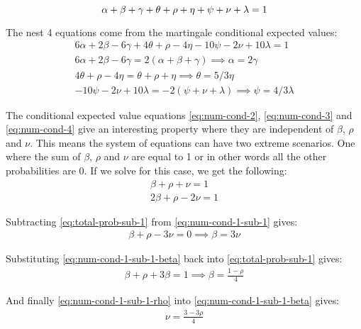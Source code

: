 \documentclass{article}
\begin{document}
\begin{equation}
    \alpha + \beta + \gamma + \theta + \rho + \eta + \psi + \nu + \lambda = 1 \label{eq:total-prob} \\
\end{equation}

The nest 4 equations come from the martingale conditional expected values:
\begin{align}
    6\alpha + 2\beta - 6\gamma + 4\theta + \rho - 4\eta - 10\psi - 2\nu + 10\lambda = 1 \label{eq:num-cond-1} \\
    6\alpha + 2\beta - 6\gamma = 2(\alpha + \beta + \gamma) \implies \alpha = 2\gamma \label{eq:num-cond-2} \\
    4\theta + \rho - 4\eta = \theta + \rho + \eta \implies \theta = 5/3\eta \label{eq:num-cond-3} \\
    - 10\psi - 2\nu + 10\lambda = - 2(\psi + \nu + \lambda) \implies \psi = 4/3 \lambda \label{eq:num-cond-4}
\end{align}

The conditional expected value equations \ref{eq:num-cond-2}, \ref{eq:num-cond-3} and \ref{eq:num-cond-4} give an interesting property where they are independent of $\beta$, $\rho$ and $\nu$. This means the system of equations can have two extreme scenarios. One where the sum of $\beta$, $\rho$ and $\nu$ are equal to 1 or in other words all the other probabilities are 0. If we solve for this case, we get the following:
\begin{align}
    \beta + \rho + \nu = 1 \label{eq:total-prob-sub-1} \\
    2\beta  + \rho - 2\nu = 1 \label{eq:num-cond-1-sub-1}
\end{align}

Subtracting \ref{eq:total-prob-sub-1} from  \ref{eq:num-cond-1-sub-1} gives:
\begin{align}
    \beta  + \rho - 3\nu = 0 \implies \beta = 3\nu \label{eq:num-cond-1-sub-1-beta}
\end{align}

Substituting \ref{eq:num-cond-1-sub-1-beta} back into \ref{eq:total-prob-sub-1} gives:
\begin{align}
    \beta  + \rho + 3\beta = 1 \implies \beta = \frac{1-\rho}{4} \label{eq:num-cond-1-sub-1-rho}
\end{align}

And finally \ref{eq:num-cond-1-sub-1-rho} into \ref{eq:num-cond-1-sub-1-beta} gives:
\begin{align}
    \nu = \frac{3-3\rho}{4} \label{eq:num-cond-1-sub-1-nu}
\end{align}
\end{document}

